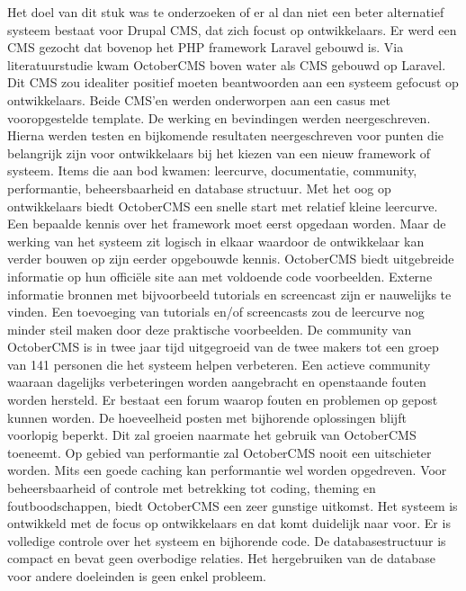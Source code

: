 \label{ch:conclusie}

Het doel van dit stuk was te onderzoeken of er al dan niet een beter alternatief systeem bestaat voor Drupal CMS, dat zich focust op ontwikkelaars. Er werd een CMS gezocht dat bovenop het PHP framework Laravel gebouwd is.
\newline\newline
Via literatuurstudie kwam OctoberCMS boven water als CMS gebouwd op Laravel. Dit CMS zou idealiter positief moeten beantwoorden aan een systeem gefocust op ontwikkelaars. Beide CMS'en werden onderworpen aan een casus met vooropgestelde template. De werking en bevindingen werden neergeschreven. Hierna werden testen en bijkomende resultaten neergeschreven voor punten die belangrijk zijn voor ontwikkelaars bij het kiezen van een nieuw framework of systeem.
\newline\newline
Items die aan bod kwamen: leercurve, documentatie, community, performantie, beheersbaarheid en database structuur.
Met het oog op ontwikkelaars biedt OctoberCMS een snelle start met relatief kleine leercurve. Een bepaalde kennis over het framework moet eerst opgedaan worden. Maar de werking van het systeem zit logisch in elkaar waardoor de ontwikkelaar kan verder bouwen op zijn eerder opgebouwde kennis.
OctoberCMS biedt uitgebreide informatie op hun officiële site aan met voldoende code voorbeelden. Externe informatie bronnen met bijvoorbeeld tutorials en screencast zijn er nauwelijks te vinden. Een toevoeging van tutorials en/of screencasts zou de leercurve nog minder steil maken door deze praktische voorbeelden. 
De community van OctoberCMS is in twee jaar tijd uitgegroeid van de twee makers tot een groep van 141 personen die het systeem helpen verbeteren. Een actieve community waaraan dagelijks verbeteringen worden aangebracht en openstaande fouten worden hersteld. Er bestaat een forum waarop fouten en problemen op gepost kunnen worden. De hoeveelheid posten met bijhorende oplossingen blijft voorlopig beperkt. Dit zal groeien naarmate het gebruik van OctoberCMS toeneemt.
Op gebied van performantie zal OctoberCMS nooit een uitschieter worden. Mits een goede caching kan performantie wel worden opgedreven.
Voor beheersbaarheid of controle met betrekking tot coding, theming en foutboodschappen, biedt OctoberCMS een zeer gunstige uitkomst. Het systeem is ontwikkeld met de focus op ontwikkelaars en dat komt duidelijk naar voor. Er is volledige controle over het systeem en bijhorende code.
De databasestructuur is compact en bevat geen overbodige relaties. Het hergebruiken van de database voor andere doeleinden is geen enkel probleem.
